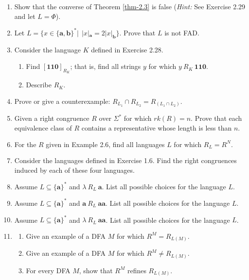\begin{enumerate}[{2.}1.]
\item Show that the converse of Theorem \ref{thm-2.3} is false (\emph{Hint:} See Exercise
2.29 and let $L = \Phi$).

\item Let $L=\{x \in \{\pmb{a},\pmb{b}\}^* |\ \ |x|_{\pmb{a}} = 2|x|_{\pmb{b}}\}$.
Prove that $L$ is not FAD.

\item Consider the language $K$ defined in Exercise 2.28.
\begin{enumerate}
\item Find $[\pmb{110}]_{R_K}$; that is, find all strings $y$ for which
$y\ R_K\ \pmb{110}$.
\item Describe $R_K$.
\end{enumerate}

\item Prove or give a counterexample: $R_{L_1} \cap R_{L_2} = R_{(L_1 \cap
L_2)}$.

\item Given a right congruence $R$ over $\Sigma^*$ for which $rk(R) = n$. Prove
that each equivalence class of $R$ contains a representative whose length is
less than $n$.

\item For the $R$ given in Example 2.6, find all languages $L$ for which $R_L =
R^N$.

\item Consider the languages defined in Exercise 1.6. Find the right congruences
induced by each of these four languages.

\item Assume $L \subseteq \{\pmb{a}\}^*$ and $\lambda\ R_L\ \pmb{a}$. List all
possible choices for the language $L$.

\item Assume $L \subseteq \{\pmb{a}\}^*$ and $\pmb{a}\ R_L\ \pmb{aa}$. List all
possible choices for the language $L$.

\item Assume $L \subseteq \{\pmb{a}\}^*$ and $\lambda\ R_L\ \pmb{aa}$. List all
possible choices for the language $L$.

\item \begin{enumerate}
\item Give an example of a DFA $M$ for which $R^M = R_{L(M)}$.
\item Give an example of a DFA $M$ for which $R^M \not= R_{L(M)}$.
\item For every DFA $M$, show that $R^M$ refines $R_{L(M)}$.
\end{enumerate}


\end{enumerate}
